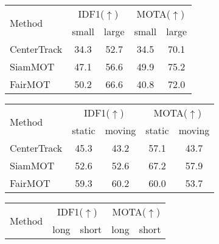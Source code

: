 \documentclass[runningheads]{llncs}
\begin{document}
\begin{table}[t]
\begin{minipage}[t]{0.45\textwidth}
    \small
    \centering
    \begin{tabular}{lcccc}
        \toprule
        \multirow{2}{*}{Method}  & \multicolumn{2}{c}{IDF1($\uparrow$)} & \multicolumn{2}{c}{MOTA($\uparrow$)}  \\
                     & small & large & small & large \\
        \midrule


        CenterTrack  & 34.3  & 52.7  & 34.5  & 70.1 \\
        SiamMOT  & 47.1  & 56.6  & 49.9  & 75.2 \\
        FairMOT  & 50.2  & 66.6  & 40.8  & 72.0 \\
        \bottomrule
    \end{tabular}
    \label{tab:small_large_size}
\end{minipage}
\hfill
\begin{minipage}[t]{0.5\textwidth}
    \small
    \centering
    \begin{tabular}{lcccc}
        \toprule
        \multirow{2}{*}{Method}  & \multicolumn{2}{c}{IDF1($\uparrow$)} & \multicolumn{2}{c}{MOTA($\uparrow$)}  \\
                 & static & moving & static & moving \\
        \midrule


        CenterTrack  & 45.3  & 43.2  & 57.1  & 43.7 \\
        SiamMOT  & 52.6  & 52.6  & 67.2  & 57.9 \\
        FairMOT  & 59.3  & 60.2  & 60.0  & 53.7 \\
        \bottomrule
    \end{tabular}
    \label{tab:static_moving}
\end{minipage}
\begin{minipage}[t]{0.45\textwidth}
    \small
    \centering
    \begin{tabular}{lcccc}
        \toprule
        \multirow{2}{*}{Method}  & \multicolumn{2}{c}{IDF1($\uparrow$)} & \multicolumn{2}{c}{MOTA($\uparrow$)}  \\
                     & long & short & long & short \\
        \midrule



\end{tabular}
\end{minipage}
\end{table}
\end{document}
